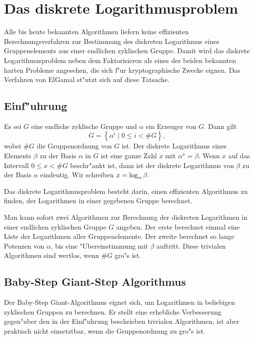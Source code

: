 \chapter{Das diskrete Logarithmusproblem}

Alle bis heute bekannten Algorithmen liefern keine effizienten
Berechnungsverfahren zur Bestimmung des diskreten Logarithmus eines
Gruppenelements aus einer endlichen zyklischen Gruppe. Damit wird das 
diskrete Logarithmusproblem neben dem Faktorisieren als eines der beiden 
bekannten harten Probleme angesehen, die sich f"ur kryptographische 
Zwecke eignen. Das Verfahren von ElGamal st"utzt sich auf diese Tatsache.

\section{Einf"uhrung}

Es sei $G$ eine endliche zyklische Gruppe und $\alpha$ ein Erzeuger von $G$.
Dann gilt 
$$ G = \left\{\alpha^i\mid 0\le i < \#G\right\}, $$
wobei $\#G$ die Gruppenordnung von $G$ ist. Der diskrete Logarithmus
eines Elements $\beta$ zu der Basis $\alpha$ in $G$ ist eine ganze Zahl $x$ mit
$\alpha^x = \beta$. Wenn $x$ auf das Intervall $0\le x < \#G$ beschr"ankt ist,
dann ist der diskrete Logarithmus von $\beta$ zu der Basis $\alpha$
eindeutig. Wir schreiben $x = \log_{\alpha} \beta$.

Das diskrete Logarithmusproblem besteht darin, einen effizienten
Algorithmus zu finden, der Logarithmen in einer gegebenen Gruppe 
berechnet.

Man kann sofort zwei Algorithmen zur Berechnung der diskreten Logarithmen
in einer endlichen zyklischen Gruppe $G$ angeben. Der erste berechnet
einmal eine Liste der Logarithmen aller Gruppenelemente. Der zweite
berechnet so lange Potenzen von $\alpha$, bis eine "Ubereinstimmung mit
$\beta$ auftritt. Diese trivialen Algorithmen sind wertlos, wenn $\#G$ 
gro"s ist.

\section{Baby-Step Giant-Step Algorithmus}
Der Baby-Step Giant-Algorithmus eignet sich, um Logarithmen in beliebigen
zyklischen Gruppen zu berechnen. Er stellt eine erhebliche Verbesserung
gegen"uber den in der Einf"uhrung beschrieben trivialen Algorithmen, ist
aber praktisch nicht einsetztbar, wenn die Gruppenordnung zu gro"s ist.

